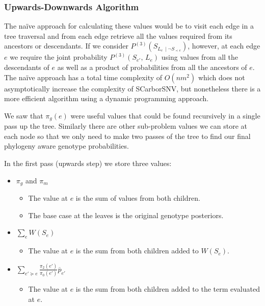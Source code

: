 \documentclass[../../main.tex]{subfiles}
\begin{document}
\subsubsection*{Upwards-Downwards Algorithm}
The na\"ive approach for calculating these values would be to visit each edge in a tree traversal and from each edge retrieve all the values required from its ancestors or descendants.
If we consider $P^{(3)}(S_{L_e\,\mid\neg S_{\prec e}})$, however, at each edge $e$ we require the joint probability $P^{(3)}(S_{e'},\,L_e)$ using values from all the descendants of $e$ as well as a product of probabilities from all the ancestors of $e$.
The na\"ive approach has a total time complexity of $O(nm^2)$ which does not asymptotically increase the complexity of SCarborSNV, but nonetheless there is a more efficient algorithm using a dynamic programming approach.

We saw that $\pi_g(e)$ were useful values that could be found recursively in a single pass up the tree.
Similarly there are other sub-problem values we can store at each node so that we only need to make two passes of the tree to find our final phylogeny aware genotype probabilities.

In the first pass (upwards step) we store three values:
\begin{itemize}
    \item $\pi_g$ and $\pi_m$
        \begin{itemize}
            \item The value at $e$ is the sum of values from both children.
            \item The base case at the leaves is the original genotype posteriors.
        \end{itemize}
    \item $\sum_e W(S_e)$
        \begin{itemize}
            \item The value at $e$ is the sum from both children added to $W(S_e)$.
        \end{itemize}
    \item $\sum_{e'\succeq e} \frac{\pi_2(e')}{\pi_0(e')}\overline{p}_{e'}$
        \begin{itemize}
            \item The value at $e$ is the sum from both children added to the term evaluated at $e$.
        \end{itemize}
\end{itemize}
\end{document}
